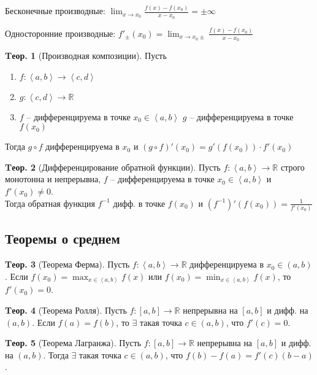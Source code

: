 \documentclass[a4paper,12pt]{article}
\numberwithin{figure}{section}
\theoremstyle{definition}
\theoremstyle{definition}
\newtheorem{theorem}{Tеор.}[section]
\def\DS{\displaystyle}
\def\RR{\mathbb{R}}
\def\on{\!:}
\def\intab{\left<a,b\right>}
\begin{document}
Бесконечные производные:
$\DS \lim_{x\to x_0}\frac{f(x)-f(x_0)}{x-x_0} = \pm\infty$

Односторонние производные:
$\DS f'_{\pm}(x_0) = \lim_{x\to x_0\pm}\frac{f(x)-f(x_0)}{x-x_0}$
\bigskip

\begin{theorem}[Производная композиции]
	Пусть
	\begin{enumerate}
		\item $f\on \intab \to \left<c,d\right>$
		\item $g\on \left<c,d\right> \to \RR$
		\item $f$ -- дифференцируема в точке $x_0 \in\intab$
		$g$ -- дифференцируема в точке $f(x_0)$
	\end{enumerate}
	Тогда $g \circ f$ дифференцируема в $x_0$ и
	$(g \circ f)'(x_0) = g'(f(x_0)) \cdot f'(x_0)$
\end{theorem}
\medskip

\begin{theorem}[Дифференцирование обратной функции]
	Пусть $f\on\intab\to\RR$ строго монотонна и непрерывна,
	$f$ -- дифференцируема в точке $x_0 \in\intab$ и $f'(x_0) \ne 0$. \\
	Тогда обратная функция $f^{-1}$ дифф. в точке $f(x_0)$ и
	$\DS \left(f^{-1}\right)'\left(f(x_0)\right) = \frac1{f'(x_0)}$
\end{theorem}


\subsection{Теоремы о среднем}

\begin{theorem}[Теорема Ферма]
	Пусть $f\on\intab\to\RR$ дифференцируема в $x_0\in(a,b)$.
	Если $\DS f(x_0)=\max_{x\in\intab}f(x)$ или $f(x_0)=\min_{x\in\intab}f(x)$,
	то $f'(x_0)=0$.
\end{theorem}
\bigskip


\begin{theorem}[Теорема Ролля]
	Пусть $f\on[a,b]\to\RR$ непрерывна на $[a,b]$ и дифф. на $(a,b)$.
	Если $f(a)=f(b)$, то $\exists$ такая точка $c\in(a,b)$, что $f'(c)=0$.
\end{theorem}
\bigskip


\begin{theorem}[Теорема Лагранжа]
	Пусть $f\on[a,b]\to\RR$ непрерывна на $[a,b]$ и дифф. на $(a,b)$.
	Тогда $\exists$ такая точка $c\in(a,b)$, что $f(b)-f(a)=f'(c)(b-a)$.
\end{theorem}
\bigskip
\end{document}
